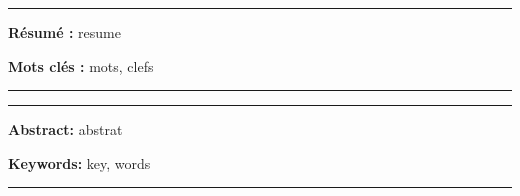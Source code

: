 \pagestyle{empty} %

\begin{vcenterpage} %
\noindent\rule[2pt]{\textwidth}{0.5pt}

{\large\textbf{Résumé :}}
resume

{\large\textbf{Mots clés :}}
mots, clefs

\noindent\rule[2pt]{\textwidth}{0.5pt}
\end{vcenterpage}

\newpage
\begin{vcenterpage}
\noindent\rule[2pt]{\textwidth}{0.5pt}

{\large\textbf{Abstract:}}
abstrat

{\large\textbf{Keywords:}}
key, words

\noindent\rule[2pt]{\textwidth}{0.5pt}
\end{vcenterpage}
